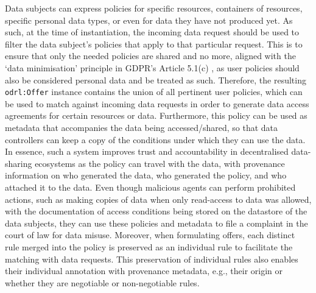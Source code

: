 Data subjects can express policies for specific resources, containers of resources, specific personal data types, or even for data they have not produced yet.
As such, at the time of instantiation, the incoming data request should be used to filter the data subject's policies that apply to that particular request.
This is to ensure that only the needed policies are shared and no more, aligned with the `data minimisation' principle in GDPR's Article 5.1(c) \citeyearpar{noauthor_regulation_2016}, as user policies should also be considered personal data and be treated as such.
Therefore, the resulting \texttt{odrl:Offer} instance contains the union of all pertinent user policies, which can be used to match against incoming data requests in order to generate data access agreements for certain resources or data.
Furthermore, this policy can be used as metadata that accompanies the data being accessed/shared, so that data controllers can keep a copy of the conditions under which they can use the data.
In essence, such a system improves trust and accountability in decentralised data-sharing ecosystems as the policy can travel with the data, with provenance information on who generated the data, who generated the policy, and who attached it to the data.
Even though malicious agents can perform prohibited actions, such as making copies of data when only read-access to data was allowed, with the documentation of access conditions being stored on the datastore of the data subjects, they can use these policies and metadata to file a complaint in the court of law for data misuse.
Moreover, when formulating offers, each distinct rule merged into the policy is preserved as an individual rule to facilitate the matching with data requests.
This preservation of individual rules also enables their individual annotation with provenance metadata, e.g., their origin or whether they are negotiable or non-negotiable rules.

